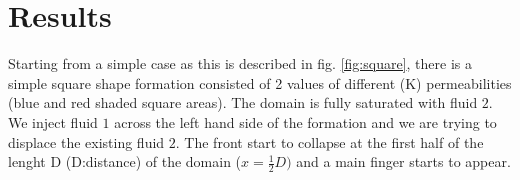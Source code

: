 \documentclass[preprint,authoryear,12pt]{elsarticle}
\begin{document}


\pagebreak
\clearpage

%

\pagebreak
\clearpage



 

\pagebreak
\clearpage

\pagebreak
\clearpage
%
%

\section{Results}\label{section:results}

Starting from a simple case as this is described in fig. \ref{fig:square}, there is a simple square shape formation consisted of 2 values of different (K) permeabilities (blue and red shaded square areas). The domain is fully saturated with fluid $2$. We inject fluid $1$ across the left hand side of the formation and we are trying to displace the existing fluid $2$. The front start to collapse at the first half of the lenght D (D:distance) of the domain ($x= \frac{1}{2} D)$ and a main finger starts to appear.
\end{document}

